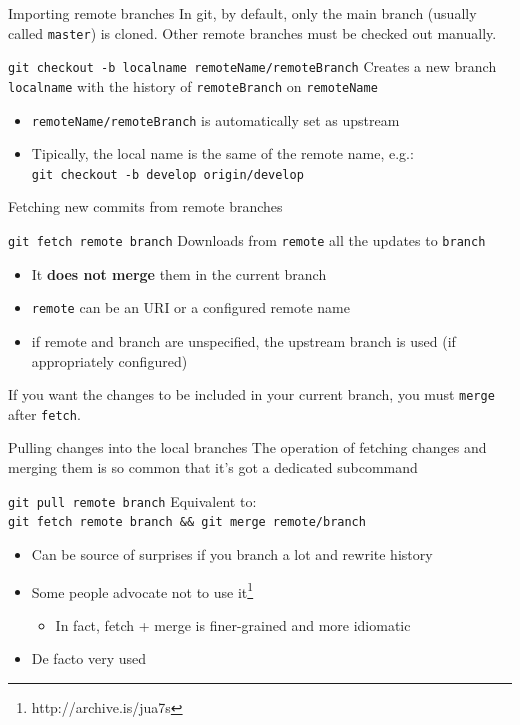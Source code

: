 \documentclass[presentation]{beamer}
\begin{document}
\begin{frame}{Importing remote branches}
    In git, by default, only the main branch (usually called \texttt{master}) is cloned. Other remote branches must be checked out manually.
    \begin{block}{\texttt{git checkout -b localname remoteName/remoteBranch}}
        Creates a new branch \texttt{localname} with the history of \texttt{remoteBranch} on \texttt{remoteName}
        \begin{itemize}
            \item \texttt{remoteName/remoteBranch} is automatically set as upstream
            \item Tipically, the local name is the same of the remote name, e.g.: \\
            \texttt{git checkout -b develop origin/develop}
        \end{itemize}
    \end{block}
\end{frame}

\begin{frame}{Fetching new commits from remote branches}
    \begin{block}{\texttt{git fetch remote branch}}
        Downloads from \texttt{remote} all the updates to \texttt{branch}
        \begin{itemize}
            \item It \textbf{does not merge} them in the current branch
            \item \texttt{remote} can be an URI or a configured remote name
            \item if remote and branch are unspecified, the upstream branch is used (if appropriately configured)
        \end{itemize}
        If you want the changes to be included in your current branch, you must \texttt{merge} after \texttt{fetch}.
    \end{block}
\end{frame}

\begin{frame}{Pulling changes into the local branches}
    The operation of fetching changes and merging them is so common that it's got a dedicated subcommand
    \begin{block}{\texttt{git pull remote branch}}
        Equivalent to: \\ \texttt{git fetch remote branch \&\& git merge remote/branch}
        \begin{itemize}
            \item Can be source of surprises if you branch a lot and rewrite history
            \item Some people advocate not to use it\footnote{http://archive.is/jua7s}
            \begin{itemize}
                \item In fact, fetch + merge is finer-grained and more idiomatic
            \end{itemize}
            \item De facto very used
        \end{itemize}
    \end{block}
\end{frame}
\end{document}
